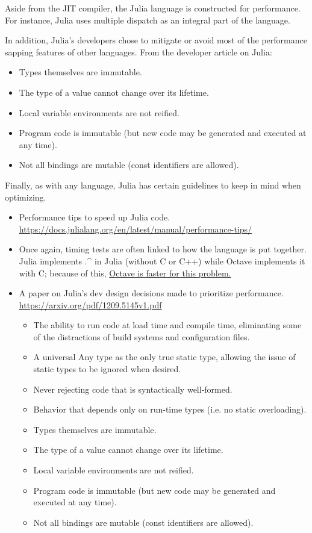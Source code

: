 \documentclass[10pt]{article}
\begin{document}
Aside from the JIT compiler, the Julia language is constructed for performance. For instance, Julia uses multiple dispatch as an integral part of the language. 

In addition, Julia's developers chose to mitigate or avoid most of the performance sapping features of other languages. From the developer article on Julia\cite{juliadevs}:
\begin{itemize}
	\item Types themselves are immutable.
    \item The type of a value cannot change over its lifetime.
    \item Local variable environments are not reified.
    \item Program code is immutable (but new code may be generated and executed at any time).
    \item Not all bindings are mutable (const identifiers are allowed).
\end{itemize}

Finally, as with any language, Julia has certain guidelines to keep in mind when optimizing. 

\fxnote{---}

\begin{itemize}
\item Performance tips to speed up Julia code. 
\url{https://docs.julialang.org/en/latest/manual/performance-tips/} 

\item Once again, timing tests are often linked to how the language is put together. Julia implements .\string^ in Julia (without C or C++) while Octave implements it with C; because of this, \href{https://stackoverflow.com/questions/19208014/is-the-julia-language-really-as-fast-as-it-claims}{Octave is faster for this problem.}

\item A paper on Julia’s dev design decisions made to prioritize performance.
\url{https://arxiv.org/pdf/1209.5145v1.pdf}
\begin{itemize}
\item The ability to run code at load time and compile time, eliminating some of the distractions
of build systems and configuration files.
\item A universal Any type as the only true static type, allowing the issue of static types to be
ignored when desired.
\item Never rejecting code that is syntactically well-formed.
\item Behavior that depends only on run-time types (i.e. no static overloading).
\item Types themselves are immutable.
\item The type of a value cannot change over its lifetime.
\item Local variable environments are not reified.
\item Program code is immutable (but new code may be generated and executed at any time).
\item Not all bindings are mutable (const identifiers are allowed).
\end{itemize}
\end{itemize}
\end{document}
